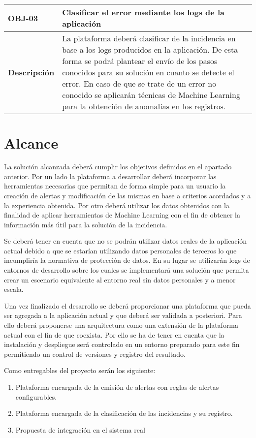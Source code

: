 \begin{table}[H]
\centering
\renewcommand{\arraystretch}{1.5}
\begin{tabular}{| p{2.5cm} | p{10cm} |}
\hline

\bf{OBJ-03} \cellcolor{Gray} & \textbf{Clasificar el error mediante los logs de la aplicación} \\
\hline
\bf{Descripción} \cellcolor{Gray} & La plataforma deberá clasificar de la incidencia en base a los logs producidos en la aplicación. De esta forma se podrá plantear el envío de los pasos conocidos para su solución en cuanto se detecte el error. En caso de que se trate de un error no conocido se aplicarán técnicas de Machine Learning para la obtención de anomalías en los registros.
\\
\hline
\end{tabular}
\end{table}


\section{Alcance}

La solución alcanzada deberá cumplir los objetivos definidos en el apartado anterior. Por un lado la plataforma a desarrollar deberá incorporar las herramientas necesarias que permitan de forma simple para un usuario la creación de alertas y modificación de las mismas en base a criterios acordados y a la experiencia obtenida. Por otro deberá utilizar los datos obtenidos con la finalidad de aplicar herramientas de Machine Learning con el fin de obtener la información más útil para la solución de la incidencia.

Se deberá tener en cuenta que no se podrán utilizar datos reales de la aplicación actual debido a que se estarían utilizando datos personales de terceros lo que incumpliría la normativa de protección de datos. En su lugar se utilizarán logs de entornos de desarrollo sobre los cuales se implementará una solución que permita crear un escenario equivalente al entorno real sin datos personales y a menor escala.

Una vez finalizado el desarrollo se deberá proporcionar una plataforma que pueda ser agregada a la aplicación actual y que deberá ser validada a posteriori. Para ello deberá proponerse una arquitectura como una extensión de la plataforma actual con el fin de que coexista. Por ello se ha de tener en cuenta que la instalación y despliegue será controlado en un entorno preparado para este fin permitiendo un control de versiones y registro del resultado.

Como entregables del proyecto serán los siguiente:
\begin{enumerate}
\item Plataforma encargada de la emisión de alertas con reglas de alertas configurables.
\item Plataforma encargada de la clasificación de las incidencias y su registro.
\item Propuesta de integración en el sistema real
\end{enumerate}